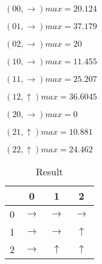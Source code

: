 \documentclass[12pt]{amsart}
\begin{document}
$(00,\rightarrow) max=20.124$

$(01,\rightarrow) max=37.179$

$(02,\rightarrow) max=20$ 

$(10,\rightarrow) max=11.455$

$(11,\rightarrow) max=25.207$

$(12,\uparrow) max=36.6045$

$(20,\rightarrow) max=0$

$(21,\uparrow) max=10.881$

$(22,\uparrow) max=24.462$

\begin{table}[!hbp]
\begin{tabular}{|c|c|c|c|}
\hline
\hline
 & 0 & 1 & 2  \\
\hline
0 & $\rightarrow$ & $\rightarrow$ & $\rightarrow$  \\
\hline
1 & $\rightarrow$ & $\rightarrow$ & $\uparrow$  \\
\hline
2 & $\rightarrow$ & $\uparrow$ & $\uparrow $ \\
\hline
\end{tabular}
\caption{Result}
\end{table} 
\end{document}
